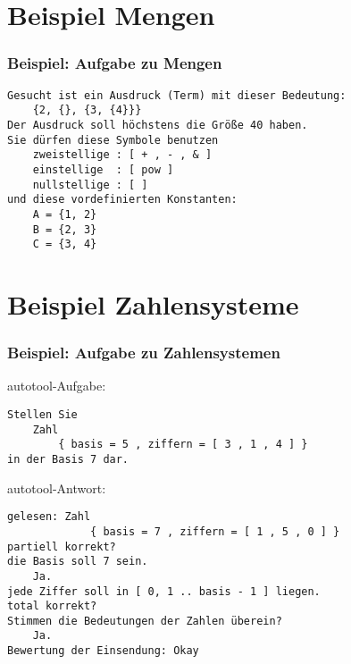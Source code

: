 \section{Beispiel Mengen}
\begin{frame}[fragile]
  \frametitle{Beispiel: Aufgabe zu Mengen}
  {\small
\begin{verbatim}
Gesucht ist ein Ausdruck (Term) mit dieser Bedeutung:
    {2, {}, {3, {4}}}
Der Ausdruck soll höchstens die Größe 40 haben.
Sie dürfen diese Symbole benutzen
    zweistellige : [ + , - , & ]
    einstellige  : [ pow ]
    nullstellige : [ ]
und diese vordefinierten Konstanten:
    A = {1, 2}
    B = {2, 3}
    C = {3, 4}
\end{verbatim}
  }
\end{frame}
\section{Beispiel Zahlensysteme}
\begin{frame}[fragile]
  \frametitle{Beispiel: Aufgabe zu Zahlensystemen}
  {\small
    autotool-Aufgabe: 
\begin{verbatim}
Stellen Sie
    Zahl
        { basis = 5 , ziffern = [ 3 , 1 , 4 ] }
in der Basis 7 dar.
\end{verbatim}
    \pause\vfill


    autotool-Antwort:
\begin{verbatim}
gelesen: Zahl
             { basis = 7 , ziffern = [ 1 , 5 , 0 ] }
partiell korrekt?
die Basis soll 7 sein.
    Ja.
jede Ziffer soll in [ 0, 1 .. basis - 1 ] liegen.
total korrekt?
Stimmen die Bedeutungen der Zahlen überein?
    Ja.
Bewertung der Einsendung: Okay
\end{verbatim}
  }
\end{frame}

